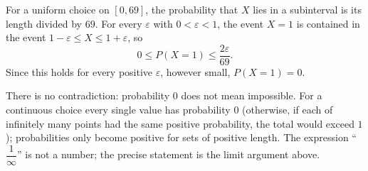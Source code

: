 For a uniform choice on $[0,69]$, the probability that $X$ lies in a subinterval is its length divided by $69$. For every $\varepsilon$ with $0<\varepsilon<1$, the event $X=1$ is contained in the event $1-\varepsilon\le X\le1+\varepsilon$, so
\[
0\le P(X=1)\le\dfrac{2\varepsilon}{69}.
\]
Since this holds for every positive $\varepsilon$, however small, $P(X=1)=\boxed{0}$.

There is no contradiction: probability $0$ does not mean impossible. For a continuous choice every single value has probability $0$ (otherwise, if each of infinitely many points had the same positive probability, the total would exceed $1$); probabilities only become positive for sets of positive length. The expression ``$\dfrac{1}{\infty}$'' is not a number; the precise statement is the limit argument above.
